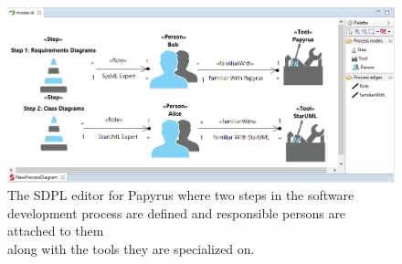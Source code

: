 \begin{figure}[h]
	\vspace*{-5mm}
	
	\vspace*{-5mm}
\end{figure}


\begin{figure}[t]
	\centering
	\includegraphics[width=1\textwidth]{images/sdplEditor.png}
	\caption[]{The SDPL editor for Papyrus where two steps in the software 
		development process are defined and responsible persons are attached to 
		them\\ along with the tools they are specialized on.}
	\label{fig:sdplEditor}
	
\end{figure}